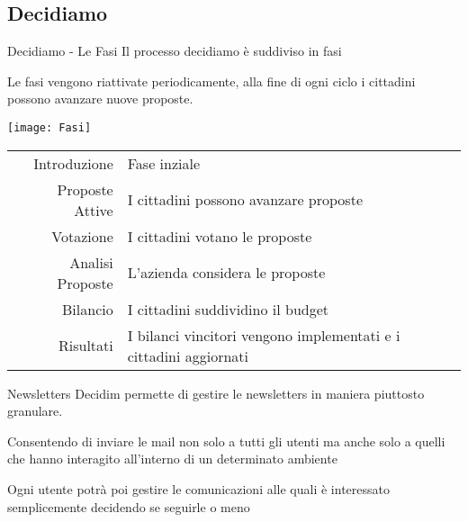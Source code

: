 \subsection{Decidiamo}
\begin{frame}{Decidiamo - Le Fasi}
  Il processo decidiamo è suddiviso in fasi

  \pause
  Le fasi vengono riattivate periodicamente, alla fine di ogni ciclo i cittadini possono avanzare nuove proposte.


  \begin{center}
    \texttt{[image: Fasi]}
  \end{center}
\end{frame}
\begin{frame}

  \begin{table}
    \renewcommand\arraystretch{1.4}

    \begin{tabular}{@{\,}r <{\hskip 2pt} !{\foo} >{\raggedright\arraybackslash}p{5cm}}

      \addlinespace[1.5ex]
      Introduzione     & \small{Fase inziale}                                                      \\
      Proposte Attive  & \small{I cittadini possono avanzare proposte}                             \\
      Votazione        & \small{I cittadini votano le proposte  }                                  \\
      Analisi Proposte & \small{L'azienda considera le proposte}                                   \\
      Bilancio         & \small{I cittadini suddividino il budget}                                 \\
      Risultati        & \small{I bilanci vincitori vengono implementati e i cittadini aggiornati} \\
    \end{tabular}
  \end{table}
\end{frame}
\begin{frame}{Newsletters}
  Decidim permette di gestire le newsletters in maniera piuttosto granulare.

  Consentendo di inviare le mail non solo a tutti gli utenti
  ma anche solo a quelli che hanno interagito all'interno di un determinato ambiente
  \pause

  Ogni utente potrà poi gestire le comunicazioni alle quali è interessato semplicemente decidendo se seguirle o meno

\end{frame}

